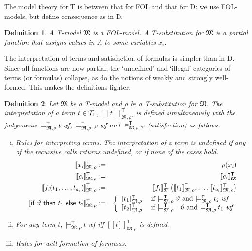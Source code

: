 \documentclass{article}
\newtheorem{definition}{Definition}[section]
\newcommand{\D}{\textsf D}
\newcommand{\T}{\textsf T}
\newcommand{\FOL}{\textsf{FOL}}
\newcommand{\ifthelse}[3]{\ensuremath{\mathsf{if}\ {#1}\ \mathsf{then}\ {#2}\ \mathsf{else}\ {#3}}}
\newcommand{\wf}{\ \mbox{\em wf}}
\newcommand{\terms}[1]{\ensuremath{{\cal T}_{\mathsf{#1}}}}
\newcommand{\intm}[3]{\ensuremath{[\![{#3}]\!]^{\mathsf{#1}}_{\mathfrak{#2}}}}
\newcommand{\ints}[4]{\ensuremath{[\![{#4}]\!]^{\mathsf{#1}}_{\mathfrak{#2},{#3}}}}
\newcommand{\mymodelss}[3]{\ensuremath{\models_{\mathfrak{#2},{#3}}^{\mathsf{#1}}}}
\begin{document}
The model theory for {\T} is between that for {\FOL} and that for {\D}:
we use {\FOL}-models, but define consequence as in {\D}.
\begin{definition}\label{defn:Tmodel} A {\T}-model $\mathfrak M$
is a {\FOL}-model.
A {\T}-substitution for $\mathfrak M$ is a partial function that assigns
values in $A$ to some variables $x_i$.
\end{definition}

The interpretation of terms and satisfaction of formulas is simpler than
in {\D}.  Since all functions are now partial, the `undefined' and
`illegal' categories of terms (or formulas) collapse, as do the notions
of weakly and strongly well-formed.  This makes the definitions lighter.
\begin{definition}\label{defn:Tinterpretation}\label{defn:Tsatisfaction}
Let $\mathfrak M$ be a {\T}-model and $\rho$ be a {\T}-substitution for
$\mathfrak M$.
The interpretation of a term $t\in\terms T$,
{\ints{T}M\rho t}, is defined simultaneously with the judgements 
$\mymodelss{T}M\rho t\wf$, $\mymodelss{T}M\rho\varphi\wf$ and
$\mymodelss{T}M\rho\varphi$ (satisfaction) as follows.
\begin{enumerate}[(i)]
\item Rules for interpreting terms.  The interpretation of a term is
undefined if any of the recursive calls returns undefined, or if none of the
cases hold.
\begin{eqnarray*}
\ints{T}M\rho{x_i} & := & \rho(x_i) \\
\ints{T}M\rho{c_i} & := & \intm{T}M{c_i} \\
\ints{T}M\rho{f_i(t_1,\ldots,t_{a_i})} & := &
 \intm{T}M{f_i}\left(\ints{T}M\rho{t_1},\ldots,\ints{T}M\rho{t_{a_i}}\right) \\
\ints{T}M\rho{\ifthelse\vartheta{t_1}{t_2}} & := & \left\{\begin{array}{ll}
   \ints{T}M\rho{t_1} & \mbox{ if $\mymodelss{T}M\rho\vartheta$ and $\mymodelss{T}M\rho t_2\wf$} \\
   \ints{T}M\rho{t_2} & \mbox{ if $\mymodelss{T}M\rho\neg\vartheta$ and $\mymodelss{T}M\rho t_1\wf$}
\end{array}\right. \\
\end{eqnarray*}
\item For any term $t$, $\mymodelss{T}M\rho t\wf$ iff $\ints{T}M\rho t$ is
defined.
\item Rules for well formation of formulas.
\begin{eqnarray*}

\end{eqnarray*}
\end{enumerate}
\end{definition}
\end{document}
